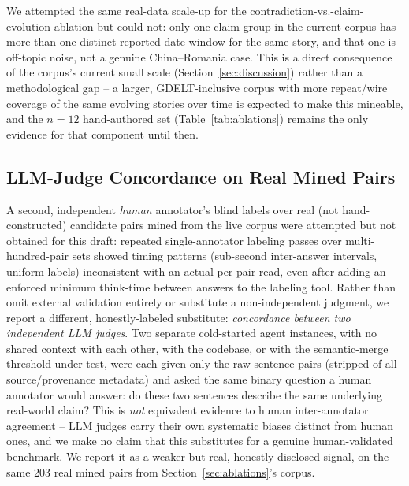 \documentclass[conference]{IEEEtran}
\begin{document}
We attempted the same real-data scale-up for the contradiction-vs.-claim-evolution
ablation but could not: only one claim group in the current corpus has more
than one distinct reported date window for the same story, and that one is
off-topic noise, not a genuine China--Romania case. This is a direct
consequence of the corpus's current small scale (Section~\ref{sec:discussion})
rather than a methodological gap -- a larger, GDELT-inclusive corpus with
more repeat/wire coverage of the same evolving stories over time is expected
to make this mineable, and the $n{=}12$ hand-authored set
(Table~\ref{tab:ablations}) remains the only evidence for that component
until then.

\subsection{LLM-Judge Concordance on Real Mined Pairs}
\label{sec:llm-judge}

A second, independent \emph{human} annotator's blind labels over real
(not hand-constructed) candidate pairs mined from the live corpus were
attempted but not obtained for this draft: repeated single-annotator
labeling passes over multi-hundred-pair sets showed timing patterns
(sub-second inter-answer intervals, uniform labels) inconsistent with an
actual per-pair read, even after adding an enforced minimum think-time
between answers to the labeling tool. Rather than omit external validation
entirely or substitute a non-independent judgment, we report a different,
honestly-labeled substitute: \emph{concordance between two independent
LLM judges}. Two separate cold-started agent instances, with no shared
context with each other, with the codebase, or with the semantic-merge
threshold under test, were each given only the raw sentence pairs (stripped
of all source/provenance metadata) and asked the same binary question a
human annotator would answer: do these two sentences describe the same
underlying real-world claim? This is \emph{not} equivalent evidence to
human inter-annotator agreement -- LLM judges carry their own systematic
biases distinct from human ones, and we make no claim that this substitutes
for a genuine human-validated benchmark. We report it as a weaker but real,
honestly disclosed signal, on the same 203 real mined pairs from
Section~\ref{sec:ablations}'s corpus.
\end{document}
